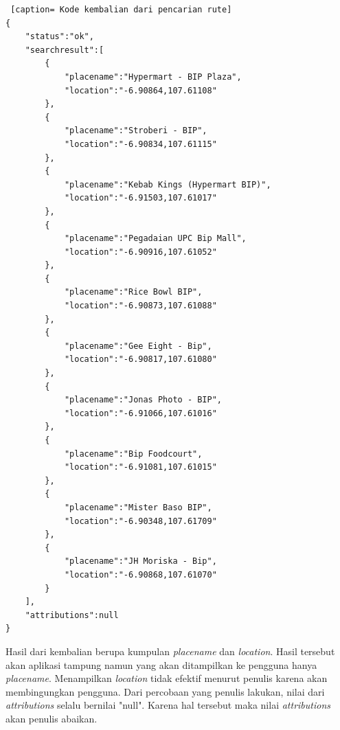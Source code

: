 \begin{lstlisting} [caption= Kode kembalian dari pencarian rute]
{ 
	"status":"ok",
	"searchresult":[
		{
			"placename":"Hypermart - BIP Plaza",
			"location":"-6.90864,107.61108"
		},
		{
			"placename":"Stroberi - BIP",
			"location":"-6.90834,107.61115"
		},
		{
			"placename":"Kebab Kings (Hypermart BIP)",
			"location":"-6.91503,107.61017"
		},
		{
			"placename":"Pegadaian UPC Bip Mall",
			"location":"-6.90916,107.61052"
		},
		{
			"placename":"Rice Bowl BIP",
			"location":"-6.90873,107.61088"
		},
		{	
			"placename":"Gee Eight - Bip",
			"location":"-6.90817,107.61080"
		},
		{
			"placename":"Jonas Photo - BIP",
			"location":"-6.91066,107.61016"
		},
		{
			"placename":"Bip Foodcourt",
			"location":"-6.91081,107.61015"
		},
		{
			"placename":"Mister Baso BIP",
			"location":"-6.90348,107.61709"
		},
		{
			"placename":"JH Moriska - Bip",
			"location":"-6.90868,107.61070"
		}
	],
	"attributions":null
}
\end{lstlisting}

Hasil dari kembalian berupa kumpulan \textit{placename} dan \textit{location}. Hasil tersebut akan aplikasi tampung namun yang akan ditampilkan ke pengguna hanya \textit{placename}. Menampilkan \textit{location} tidak efektif menurut penulis karena akan membingungkan pengguna. Dari percobaan yang penulis lakukan, nilai dari \textit{attributions} selalu bernilai "null". Karena hal tersebut maka nilai \textit{attributions} akan penulis abaikan.

